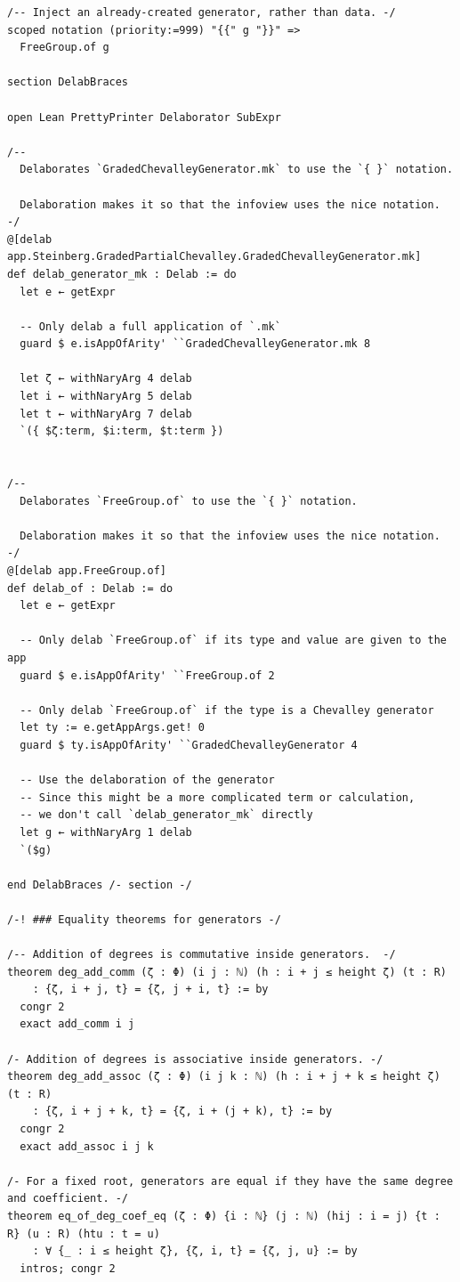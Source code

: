\begin{Verbatim}
/-- Inject an already-created generator, rather than data. -/
scoped notation (priority:=999) "{{" g "}}" =>
  FreeGroup.of g

section DelabBraces

open Lean PrettyPrinter Delaborator SubExpr

/--
  Delaborates `GradedChevalleyGenerator.mk` to use the `{ }` notation.

  Delaboration makes it so that the infoview uses the nice notation.
-/
@[delab app.Steinberg.GradedPartialChevalley.GradedChevalleyGenerator.mk]
def delab_generator_mk : Delab := do
  let e ← getExpr

  -- Only delab a full application of `.mk`
  guard $ e.isAppOfArity' ``GradedChevalleyGenerator.mk 8

  let ζ ← withNaryArg 4 delab
  let i ← withNaryArg 5 delab
  let t ← withNaryArg 7 delab
  `({ $ζ:term, $i:term, $t:term })


/--
  Delaborates `FreeGroup.of` to use the `{ }` notation.

  Delaboration makes it so that the infoview uses the nice notation.
-/
@[delab app.FreeGroup.of]
def delab_of : Delab := do
  let e ← getExpr

  -- Only delab `FreeGroup.of` if its type and value are given to the app
  guard $ e.isAppOfArity' ``FreeGroup.of 2

  -- Only delab `FreeGroup.of` if the type is a Chevalley generator
  let ty := e.getAppArgs.get! 0
  guard $ ty.isAppOfArity' ``GradedChevalleyGenerator 4

  -- Use the delaboration of the generator
  -- Since this might be a more complicated term or calculation,
  -- we don't call `delab_generator_mk` directly
  let g ← withNaryArg 1 delab
  `($g)

end DelabBraces /- section -/

/-! ### Equality theorems for generators -/

/-- Addition of degrees is commutative inside generators.  -/
theorem deg_add_comm (ζ : Φ) (i j : ℕ) (h : i + j ≤ height ζ) (t : R)
    : {ζ, i + j, t} = {ζ, j + i, t} := by
  congr 2
  exact add_comm i j

/- Addition of degrees is associative inside generators. -/
theorem deg_add_assoc (ζ : Φ) (i j k : ℕ) (h : i + j + k ≤ height ζ) (t : R)
    : {ζ, i + j + k, t} = {ζ, i + (j + k), t} := by
  congr 2
  exact add_assoc i j k

/- For a fixed root, generators are equal if they have the same degree and coefficient. -/
theorem eq_of_deg_coef_eq (ζ : Φ) {i : ℕ} (j : ℕ) (hij : i = j) {t : R} (u : R) (htu : t = u)
    : ∀ {_ : i ≤ height ζ}, {ζ, i, t} = {ζ, j, u} := by
  intros; congr 2


\end{Verbatim}
